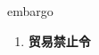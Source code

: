 
\begin{frame}
{\huge embargo}
\begin{center}
\begin{enumerate}\Large
  \item \textbf{贸易禁止令}
\end{enumerate}
\end{center}
\end{frame}
